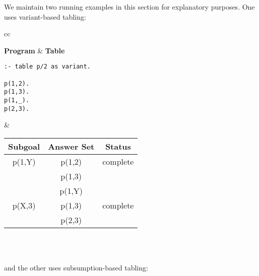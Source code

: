 We maintain two running examples in this section for explanatory
purposes.  One uses variant-based tabling:
%
\begin{center}
\begin{tabular}{cc}\hline \hline
{} \\ \hline \hline
\rule[-2ex]{0ex}{5ex} \textbf{Program} & \textbf{Table} \\
\begin{minipage}{14.5em}
\begin{verbatim}
:- table p/2 as variant.

p(1,2).
p(1,3).
p(1,_).
p(2,3).
\end{verbatim}
\end{minipage}
&
\begin{tabular}{|c|c|c|} \hline
  Subgoal & Answer Set & Status\\ \hline \hline
  p(1,Y) & p(1,2) & complete \\ 
         & p(1,3) & \\
         & p(1,Y) & \\ \hline
  p(X,3) & p(1,3) & complete \\ 
         & p(2,3) & \\ \hline
\end{tabular} \\
\vspace*{-2ex} \\ \hline \hline
\end{tabular}
\end{center}

\noindent
and the other uses subsumption-based tabling:

